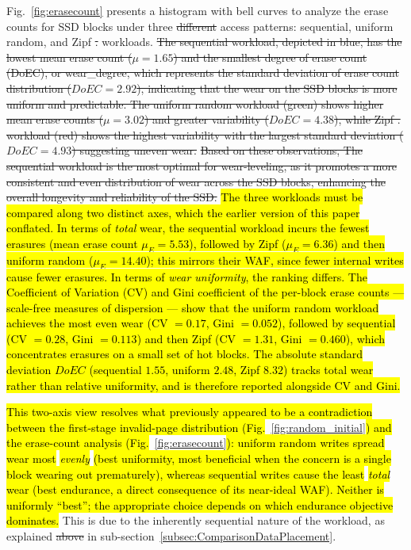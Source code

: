 \documentclass{ieeeaccess}
\begin{document}
Fig.~\ref{fig:erasecount} presents a histogram with bell curves to analyze the erase counts for SSD blocks under three \sout{different} access patterns: sequential, uniform random, and Zipf \sout{.} workloads. \sout{The sequential workload, depicted in blue, has the lowest mean erase count ($\mu = 1.65$) and the smallest degree of erase count (DoEC), or wear\_degree, which represents the standard deviation of erase count distribution ($DoEC = 2.92$), indicating that the wear on the SSD blocks is more uniform and predictable. The uniform random workload (green) shows higher mean erase counts ($\mu = 3.02$) and greater variability ($DoEC = 4.38$), while Zipf . workload (red) shows the highest variability with the largest standard deviation ($DoEC = 4.93$) suggesting uneven wear.}
\sout{Based on these observations, The sequential workload is the most optimal for wear-leveling, as it promotes a more consistent and even distribution of wear across the SSD blocks, enhancing the overall longevity and reliability of the SSD.}
\hl{The three workloads must be compared along two distinct axes, which the earlier version of this paper conflated. In terms of \emph{total} wear, the sequential workload incurs the fewest erasures (mean erase count $\mu_E = 5.53$), followed by Zipf ($\mu_E = 6.36$) and then uniform random ($\mu_E = 14.40$); this mirrors their WAF, since fewer internal writes cause fewer erasures. In terms of \emph{wear uniformity}, the ranking differs. The Coefficient of Variation (CV) and Gini coefficient of the per-block erase counts --- scale-free measures of dispersion --- show that the uniform random workload achieves the most even wear (CV $= 0.17$, Gini $= 0.052$), followed by sequential (CV $= 0.28$, Gini $= 0.113$) and then Zipf (CV $= 1.31$, Gini $= 0.460$), which concentrates erasures on a small set of hot blocks. The absolute standard deviation $DoEC$ (sequential $1.55$, uniform $2.48$, Zipf $8.32$) tracks total wear rather than relative uniformity, and is therefore reported alongside CV and Gini.}

\hl{This two-axis view resolves what previously appeared to be a contradiction between the first-stage invalid-page distribution (Fig.}~\ref{fig:random_initial}\hl{) and the erase-count analysis (Fig.}~\ref{fig:erasecount}\hl{): uniform random writes spread wear most} \emph{\hl{evenly}} \hl{(best uniformity, most beneficial when the concern is a single block wearing out prematurely), whereas sequential writes cause the least} \emph{\hl{total}} \hl{wear (best endurance, a direct consequence of its near-ideal WAF). Neither is uniformly ``best''; the appropriate choice depends on which endurance objective dominates.} This is due to the inherently sequential nature of the workload, as explained \sout{above} in sub-section~\ref{subsec:ComparisonDataPlacement}.
\end{document}
